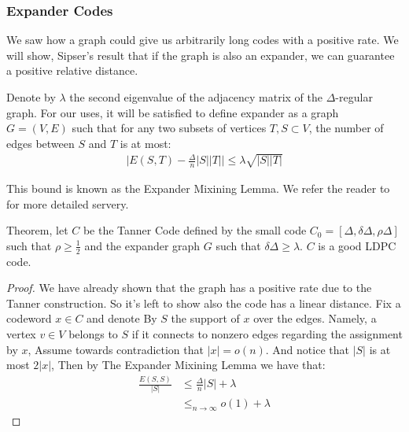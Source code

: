 \documentclass[manuscript,screen,review]{acmart}
\begin{document}
{  \subsubsection{Expander Codes}
  We saw how a graph could give us arbitrarily long codes with a positive rate. We will show, Sipser's result \cite{ExpanderCodes} that if the graph is also an expander, we can guarantee a positive relative distance. 
  \begin{definition} \label{def:mix} Denote by $\lambda$ the second eigenvalue of the adjacency matrix of the $\Delta$-regular graph. For our uses, it will be satisfied to define expander as a graph $G = \left( V,E \right)$ such that for any two subsets of vertices $T,S \subset V$, the number of edges between $S$ and $T$ is at most:
  \begin{equation*} 
    \begin{split}
      \mid E\left( S,T \right) - \frac{\Delta}{n}|S||T| \mid \le \lambda\sqrt{|S| |T|} 
    \end{split}
  \end{equation*}
\end{definition}
This bound is known as the Expander Mixining Lemma. We refer the reader to \cite{hoory2006expander} for more detailed servery. 
  \begin{theorem*} Theorem, let $C$ be the Tanner Code defined by the small code $C_{0} = [\Delta,\delta\Delta, \rho\Delta ]$ such that $\rho \ge \frac{1}{2}$ and the expander graph $G$ such that $\delta\Delta \ge \lambda$. $C$ is a good  LDPC code.
  \end{theorem*}
  \begin{proof} We have already shown that the graph has a positive rate due to the Tanner construction. So it's left to show also the code has a linear distance. Fix a codeword $x \in C$ and denote By $S$ the support of $x$ over the edges. Namely, a vertex $v\in V$ belongs to $S$ if it connects to nonzero edges regarding the assignment by $x$, Assume towards contradiction that $|x| = o\left( n \right)$. And notice that $|S|$ is at most $2|x|$, Then by The Expander Mixining Lemma we have that: 
  \begin{equation*}
    \begin{split}
      \frac{E\left( S,S \right)}{|S|} & \le \frac{\Delta}{n}|S|  + \lambda \\
      & \le_{ n \rightarrow \infty} o\left( 1 \right) + \lambda
    \end{split}
  \end{equation*}


\end{proof}}
\end{document}
